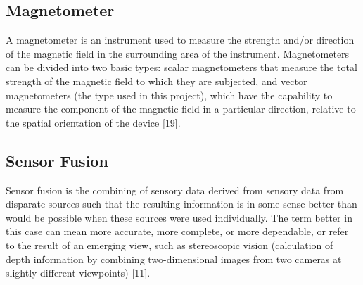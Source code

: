 \subsection{Magnetometer}
A magnetometer is an instrument used to measure the strength and/or direction of the
magnetic field in the surrounding area of the instrument.
Magnetometers can be divided into two basic types: scalar magnetometers that measure the
total strength of the magnetic field to which they are subjected, and vector magnetometers
(the type used in this project), which have the capability to measure the component of the
magnetic field in a particular direction, relative to the spatial orientation of the device [19]. 
\subsection{Sensor Fusion}
Sensor fusion is the combining of sensory data derived from sensory data from disparate
sources such that the resulting information is in some sense better than would be possible
when these sources were used individually. The term better in this case can mean more
accurate, more complete, or more dependable, or refer to the result of an emerging view, such
as stereoscopic vision (calculation of depth information by combining two-dimensional
images from two cameras at slightly different viewpoints) [11]. 


